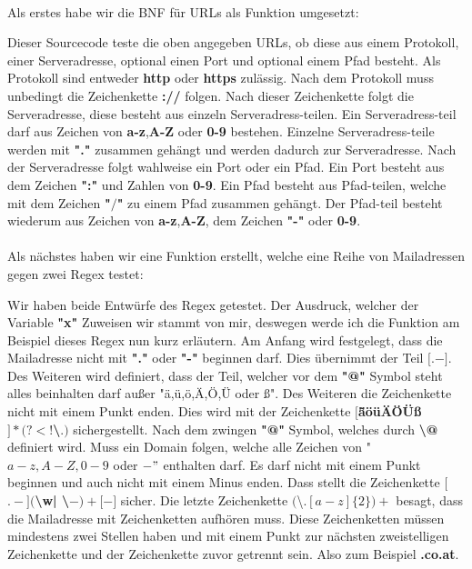 \documentclass[12pt]{article}
\begin{document}
\pagebreak\\
Als erstes habe wir die BNF für URLs als Funktion umgesetzt:

Dieser Sourcecode teste die oben angegeben URLs, ob diese aus einem Protokoll, einer Serveradresse, optional einen Port und optional einem Pfad besteht. Als Protokoll sind entweder \textbf{http} oder \textbf{https} zulässig. Nach dem Protokoll muss unbedingt die Zeichenkette \textbf{://} folgen. Nach dieser Zeichenkette folgt die Serveradresse, diese besteht aus einzeln Serveradress-teilen. Ein Serveradress-teil darf aus Zeichen von \textbf{a-z},\textbf{A-Z} oder \textbf{0-9} bestehen. Einzelne Serveradress-teile werden mit \textbf{"."} zusammen gehängt und werden dadurch zur Serveradresse. Nach der Serveradresse folgt wahlweise ein Port oder ein Pfad. Ein Port besteht aus dem Zeichen \textbf{":"} und Zahlen von \textbf{0-9}. Ein Pfad besteht aus Pfad-teilen, welche mit dem Zeichen \textbf{"$/$"} zu einem Pfad zusammen gehängt. Der Pfad-teil besteht wiederum aus Zeichen von \textbf{a-z},\textbf{A-Z}, dem Zeichen \textbf{"-"} oder \textbf{0-9}.\\\\
Als nächstes haben wir eine Funktion erstellt, welche eine Reihe von Mailadressen gegen zwei Regex testet:

Wir haben beide Entwürfe des Regex getestet. Der Ausdruck, welcher der Variable \textbf{"x"} Zuweisen wir stammt von mir, deswegen werde ich die Funktion am Beispiel dieses Regex nun kurz erläutern. Am Anfang wird festgelegt, dass die Mailadresse nicht mit \textbf{"."} oder \textbf{"-"} beginnen darf. Dies übernimmt der Teil \textbf{\^{$[$}\^{$.-]$}}. Des Weiteren wird definiert, dass der Teil, welcher vor dem \textbf{"@"} Symbol steht alles beinhalten darf außer "ä,ü,ö,Ä,Ö,Ü oder {\ss}". Des Weiteren die Zeichenkette nicht mit einem Punkt enden. Dies wird mit der Zeichenkette \textbf{$[$\^{äöüÄÖÜ{\ss}$]*(?<!$\textbackslash$.)$}} sichergestellt. Nach dem zwingen \textbf{"@"} Symbol, welches durch \textbf{\textbackslash @} definiert wird. Muss ein Domain folgen, welche alle Zeichen von "$a-z,A-Z,0-9$ oder $-"$ enthalten darf. Es darf nicht mit einem Punkt beginnen und auch nicht mit einem Minus enden. Dass stellt die Zeichenkette \textbf{$[$\^{$.-$}$]($\textbackslash w| \textbackslash$-)+[$\^{$-$}$]$} sicher. Die letzte Zeichenkette $($\textbackslash$.[a-z]\{2\})+$ besagt, dass die Mailadresse mit Zeichenketten aufhören muss. Diese Zeichenketten müssen mindestens zwei Stellen haben und mit einem Punkt zur nächsten zweistelligen Zeichenkette und der Zeichenkette zuvor getrennt sein. Also zum Beispiel \textbf{.co.at}.
\end{document}
